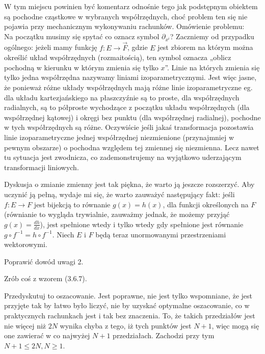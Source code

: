 \documentclass[a4paper,11pt]{article}
\begin{document}
\start {} W tym miejscu powinien być komentarz odnośnie tego
jak podstępnym obiektem są pochodne cząstkowe w wybranych
współrzędnych, choć problem ten się nie pojawia przy mechanicznym
wykonywaniu rachunków.
Omówienie problemu: \\
Na początku musimy się spytać co oznacz symbol $\partial_{ x^{ i } }$?
Zaczniemy od przypadku ogólnego: jeżeli mamy funkcję
$f : E \to \vec{ F }$, gdzie $E$ jest zbiorem na którym można określić
układ współrzędnych (rozmaitością), ten symbol oznacza „oblicz
pochodną w kierunku w którym zmienia się tylko $x$”. Linie na których
zmienia się tylko jedna współrzędna nazywamy liniami
izoparametrycznymi. Jest więc jasne, że ponieważ różne układy
współrzędnych mają różne linie izoparametryczne eg. dla układu
kartezjańskiego na płaszczyźnie są to proste, dla współrzędnych
radialnych, są to półproste wychodzące z początku układu współrzędnych
(dla współrzędnej kątowej) i okręgi bez punktu (dla współrzędnej
radialnej), pochodne w tych współrzędnych są różne. Oczywiście jeśli
jakaś transformacja pozostawia linie izoparametryczne jednej
współrzędnej niezmienione (przynajmniej w pewnym obszarze) o pochodna
względem tej zmiennej się niezmienna. Lecz nawet tu sytuacja jest
zwodnicza, co zademonstrujemy na wyjątkowo uderzającym
transformacji liniowych. \\

\vspace{\spaceFour}


\start {} Dyskusja o zmianie zmienny jest tak piękna, że warto
ją jeszcze rozszerzyć. Aby uczynić ją pełną, wydaje mi się, że warto
zauważyć następujący fakt: jeśli $f : E \to F$ jest bijekcją to
równanie $g( x ) = h( x )$, dla funkcji określonych na $F$ (równianie
to wygląda trywialnie, zauważmy jednak, że możemy przyjąć
$g( x ) = \frac{ d h }{ d x }$), jest spełnione wtedy i tylko wtedy
gdy spełnione jest równanie $g \circ f^{ -1 } = h \circ f^{ -1 }$.
Niech $E$ i $F$ będą teraz unormowanymi przestrzeniami wektorowymi.

\vspace{\spaceFour}


\start {} Poprawić dowód uwagi 2.

\vspace{\spaceFour}


\start {} Zrób coś z wzorem (3.6.7).

\vspace{\spaceFour}


\start {} Przedyskutuj to oszacowanie. Jest poprawne, nie jest
tylko wspomniane, że jest przyjęte tak by łatwo było liczyć, nie by
uzyskać optymalne oszacowanie, co w praktycznych rachunkach jest i tak
bez znaczenia. To, że takich przedziałów jest nie więcej niż $2N$
wynika chyba z tego, iż tych punktów jest $N + 1$, więc mogą się one
zawierać w co najwyżej $N + 1$ przedziałach. Zachodzi przy tym
$N + 1 \leq 2 N, N \geq 1$.
\end{document}
